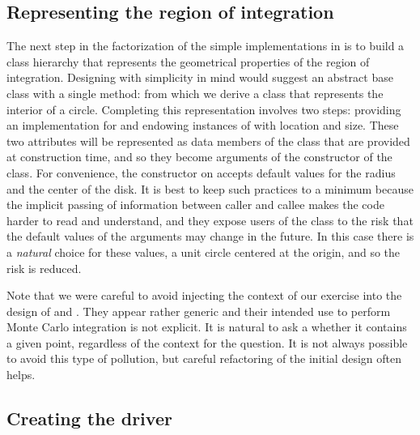 \subsection{Representing the region of integration}
\label{sec:classes:region}

The next step in the factorization of the simple implementations in  is to build
a class hierarchy that represents the geometrical properties of the region of integration.
Designing with simplicity in mind would suggest an abstract base class  with a
single method:
%
%
from which we derive a class  that represents the interior of a circle.
Completing this representation involves two steps: providing an implementation for
 and endowing instances of  with location and size. These two
attributes will be represented as data members of the class that are provided at construction
time, and so they become arguments of the constructor of the class.
%
%
For convenience, the constructor on  accepts default values for
the radius and the center of the disk. It is best to keep such practices to a minimum because
the implicit passing of information between caller and callee makes the code harder to read and
understand, and they expose users of the class  to the risk that the default values
of the arguments may change in the future. In this case there is a {\em natural} choice for
these values, a unit circle centered at the origin, and so the risk is reduced.

Note that we were careful to avoid injecting the context of our exercise into the design of
 and . They appear rather generic and their intended use to perform
Monte Carlo integration is not explicit. It is natural to ask a  whether it
contains a given point, regardless of the context for the question. It is not always possible
to avoid this type of pollution, but careful refactoring of the initial design often helps. 

\subsection{Creating the driver}
\label{sec:classes:driver}

